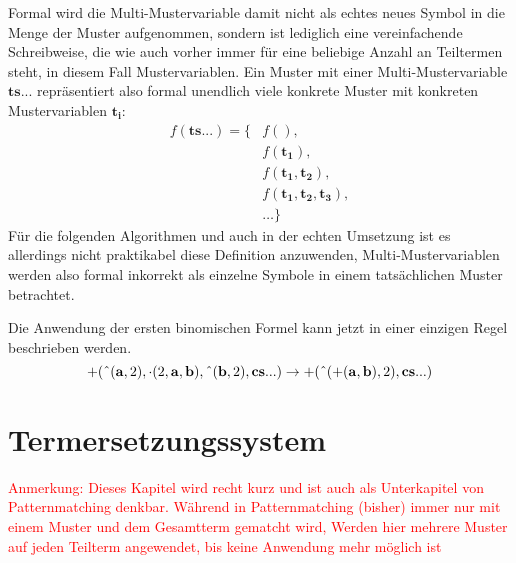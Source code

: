 \documentclass{scrartcl}
\begin{document}
Formal wird die Multi-Mustervariable damit nicht als echtes neues Symbol in die Menge der Muster aufgenommen, sondern ist lediglich eine vereinfachende Schreibweise, die wie auch vorher immer für eine beliebige Anzahl an Teiltermen steht, in diesem Fall Mustervariablen. Ein Muster mit einer Multi-Mustervariable $\mathbf{ts...}$ repräsentiert also formal unendlich viele konkrete Muster mit konkreten Mustervariablen $\mathbf{t_i}$:
\begin{equation*}
    \begin{split}
    		f(\mathbf{ts...}) = \{&f(), \\
    		&f(\mathbf{t_1}),\\
    		&f(\mathbf{t_1}, \mathbf{t_2}), \\
    		&f(\mathbf{t_1}, \mathbf{t_2}, \mathbf{t_3}), \\
    		&\dots \}    		
    \end{split}
\end{equation*}
Für die folgenden Algorithmen und auch in der echten Umsetzung ist es allerdings nicht praktikabel diese Definition anzuwenden, Multi-Mustervariablen werden also formal inkorrekt als einzelne Symbole in einem tatsächlichen Muster betrachtet.

Die Anwendung der ersten binomischen Formel kann jetzt in einer einzigen Regel beschrieben werden.
$$+(\string^(\mathbf a, 2), \cdot(2, \mathbf a, \mathbf b), \string^(\mathbf b, 2), \mathbf{cs...}) \rightarrow +(\string^(+(\mathbf a, \mathbf b), 2), \mathbf{cs...})$$

\section{Termersetzungssystem}
\textcolor{red}{
\begin{itshape}
Anmerkung: Dieses Kapitel wird recht kurz und ist auch als Unterkapitel von Patternmatching denkbar. 
Während in Patternmatching (bisher) immer nur mit einem Muster und dem Gesamtterm gematcht wird, Werden hier mehrere Muster auf jeden Teilterm angewendet, bis keine Anwendung mehr möglich ist
\end{itshape}
}
\end{document}
